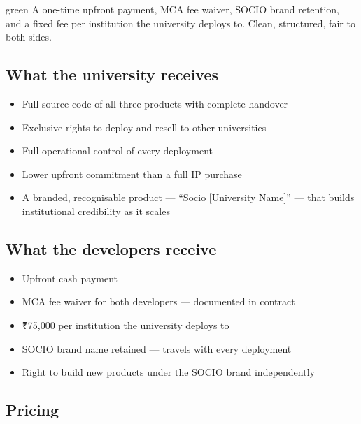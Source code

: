 \documentclass[12pt,a4paper]{article}
\begin{document}
\vspace{0.6cm}

\begin{scenariobox}{green}
A one-time upfront payment, MCA fee waiver, SOCIO brand retention, and a fixed fee per institution the university deploys to. Clean, structured, fair to both sides.
\end{scenariobox}

\vspace{0.4cm}

\subsection*{What the university receives}
\begin{itemize}[leftmargin=*, noitemsep]
    \item Full source code of all three products with complete handover
    \item Exclusive rights to deploy and resell to other universities
    \item Full operational control of every deployment
    \item Lower upfront commitment than a full IP purchase
    \item A branded, recognisable product — ``Socio [University Name]'' — that builds institutional credibility as it scales
\end{itemize}

\subsection*{What the developers receive}
\begin{itemize}[leftmargin=*, noitemsep]
    \item Upfront cash payment
    \item MCA fee waiver for both developers — documented in contract
    \item ₹75,000 per institution the university deploys to
    \item SOCIO brand name retained — travels with every deployment
    \item Right to build new products under the SOCIO brand independently
\end{itemize}

\subsection*{Pricing}
\end{document}
